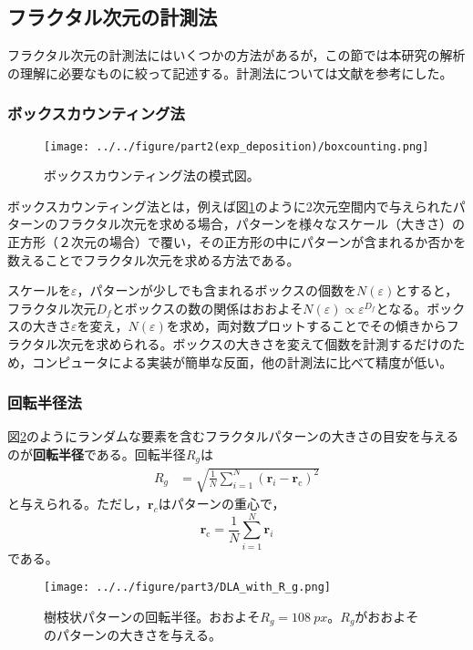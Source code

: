 \documentclass[autodetect-engine,dvi=dvipdfmx,a4paper,ja=standard,oneside,openany,11pt]{bxjsbook}
\begin{document}
\subsection{フラクタル次元の計測法}
フラクタル次元の計測法にはいくつかの方法があるが，この節では本研究の解析の理解に必要なものに絞って記述する。計測法については文献\cite{フラクタルの物理Ⅰ}を参考にした。
\subsubsection{ボックスカウンティング法}
\begin{figure}[htbp]
  \centering
  \texttt{[image: ../../figure/part2(exp\_deposition)/boxcounting.png]}
  \caption{ボックスカウンティング法の模式図\cite{表面粗さ曲線のフラクタル解析}。}
  \label{fig:box_counting}
\end{figure}

ボックスカウンティング法とは，例えば図\ref{fig:box_counting}のように2次元空間内で与えられたパターンのフラクタル次元を求める場合，パターンを様々なスケール（大きさ）の正方形（２次元の場合）で覆い，その正方形の中にパターンが含まれるか否かを数えることでフラクタル次元を求める方法である。

スケールを$\varepsilon$，パターンが少しでも含まれるボックスの個数を$N(\varepsilon)$とすると，フラクタル次元$D_f$とボックスの数の関係はおおよそ$N(\varepsilon)\propto\varepsilon^{D_f}$となる。ボックスの大きさ$\varepsilon$を変え，$N(\varepsilon)$を求め，両対数プロットすることでその傾きからフラクタル次元を求められる。ボックスの大きさを変えて個数を計測するだけのため，コンピュータによる実装が簡単な反面，他の計測法に比べて精度が低い。
\subsubsection{回転半径法}
図\ref{fig:DLA_with_R_g}のようにランダムな要素を含むフラクタルパターンの大きさの目安を与えるのが\textbf{回転半径}である。回転半径$R_g$は
\begin{align}
  R_g & =\sqrt{\frac{1}{N}\sum_{i=1}^{N}(\bm{r}_i-\bm{r}_{\mathrm{c}})^2}
  \label{eq:gyration_radius}
\end{align}
と与えられる。ただし，$\bm{r}_c$はパターンの重心で，
\begin{equation}
  \bm{r}_{\mathrm{c}}=\frac{1}{N}\sum_{i=1}^{N}\bm{r}_i
\end{equation}
である。

\begin{figure}[htbp]
  \centering
  \texttt{[image: ../../figure/part3/DLA\_with\_R\_g.png]}
  \caption{樹枝状パターンの回転半径。おおよそ$R_g=\SI{108}{px}$。$R_g$がおおよそのパターンの大きさを与える。}
  \label{fig:DLA_with_R_g}
\end{figure}
\end{document}
